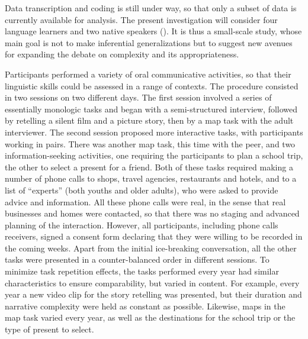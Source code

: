 \documentclass[output=paper]{langscibook}
\begin{document}
Data transcription and coding is still under way, so that only a subset of data is currently available for analysis. The present investigation will consider four language learners and two native speakers (). It is thus a small-scale study, whose main goal is not to make inferential generalizations but to suggest new avenues for expanding the debate on complexity and its appropriateness.

Participants performed a variety of oral communicative activities, so that their linguistic skills could be assessed in a range of contexts. The procedure consisted in two sessions on two different days. The first session involved a series of essentially monologic tasks and began with a semi-structured interview, followed by retelling a silent film and a picture story, then by a map task with the adult interviewer. The second session proposed more interactive tasks, with participants working in pairs. There was another map task, this time with the peer, and two information-seeking activities, one requiring the participants to plan a school trip, the other to select a present for a friend. Both of these tasks required making a number of phone calls to shops, travel agencies, restaurants and hotels, and to a list of “experts” (both youths and older adults), who were asked to provide advice and information. All these phone calls were real, in the sense that real businesses and homes were contacted, so that there was no staging and advanced planning of the interaction. However, all participants, including phone calls receivers, signed a consent form declaring that they were willing to be recorded in the coming weeks. Apart from the initial ice-breaking conversation, all the other tasks were presented in a counter-balanced order in different sessions. To minimize task repetition effects, the tasks performed every year had similar characteristics to ensure comparability, but varied in content. For example, every year a new video clip for the story retelling was presented, but their duration and narrative complexity were held as constant as possible. Likewise, maps in the map task varied every year, as well as the destinations for the school trip or the type of present to select.\largerpage
\end{document}
